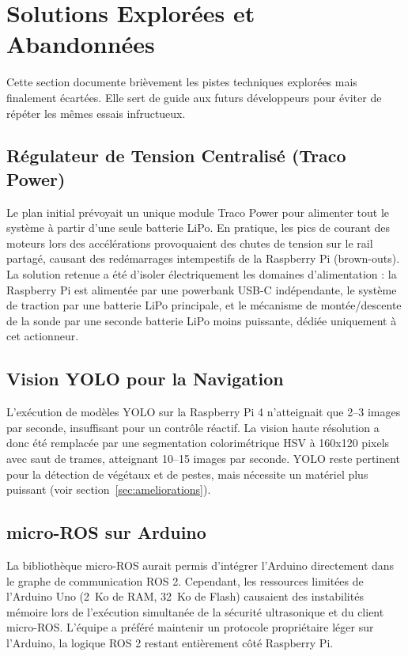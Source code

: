 \section{Solutions Explorées et Abandonnées}

Cette section documente brièvement les pistes techniques explorées mais finalement écartées. Elle sert de guide aux futurs développeurs pour éviter de répéter les mêmes essais infructueux.

\subsection{Régulateur de Tension Centralisé (Traco Power)}
Le plan initial prévoyait un unique module Traco Power pour alimenter tout le système à partir d'une seule batterie LiPo. En pratique, les pics de courant des moteurs lors des accélérations provoquaient des chutes de tension sur le rail partagé, causant des redémarrages intempestifs de la Raspberry Pi (brown-outs). La solution retenue a été d'isoler électriquement les domaines d'alimentation : la Raspberry Pi est alimentée par une powerbank USB-C indépendante, le système de traction par une batterie LiPo principale, et le mécanisme de montée/descente de la sonde par une seconde batterie LiPo moins puissante, dédiée uniquement à cet actionneur.

\subsection{Vision YOLO pour la Navigation}
L'exécution de modèles YOLO sur la Raspberry Pi 4 n'atteignait que 2--3 images par seconde, insuffisant pour un contrôle réactif. La vision haute résolution a donc été remplacée par une segmentation colorimétrique HSV à 160x120 pixels avec saut de trames, atteignant 10--15 images par seconde. YOLO reste pertinent pour la détection de végétaux et de pestes, mais nécessite un matériel plus puissant (voir section~\ref{sec:ameliorations}).

\subsection{micro-ROS sur Arduino}
La bibliothèque micro-ROS aurait permis d'intégrer l'Arduino directement dans le graphe de communication ROS 2. Cependant, les ressources limitées de l'Arduino Uno (2~Ko de RAM, 32~Ko de Flash) causaient des instabilités mémoire lors de l'exécution simultanée de la sécurité ultrasonique et du client micro-ROS. L'équipe a préféré maintenir un protocole propriétaire léger sur l'Arduino, la logique ROS 2 restant entièrement côté Raspberry Pi.

